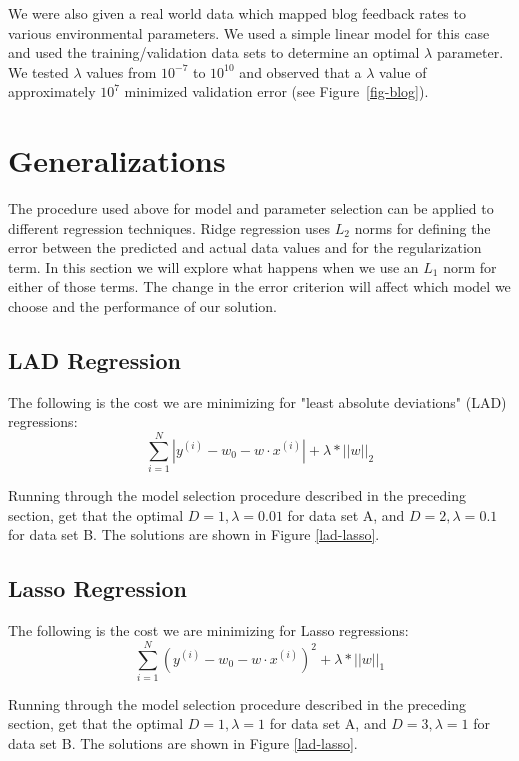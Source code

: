 \documentclass[11pt]{article}   %
\theoremstyle{plain}
\begin{document}
We were also given a real world data which mapped blog feedback rates to various environmental parameters. We used a simple linear model for this case and used the training/validation data sets to determine an optimal $\lambda$ parameter. We tested $\lambda$ values from $10^{-7}$ to $10^{10}$ and observed that a $\lambda$ value of approximately $10^7$ minimized validation error (see Figure~\ref{fig-blog}).

\section{Generalizations}

The procedure used above for model and parameter selection can be applied to different regression techniques. Ridge regression uses $L_2$ norms for defining the error between the predicted and actual data values and for the regularization term. In this section we will explore what happens when we use an $L_1$ norm for either of those terms. The change in the error criterion will affect which model we choose and the performance of our solution.

\subsection{LAD Regression}

The following is the cost we are minimizing for "least absolute deviations" (LAD) regressions: \[\sum\limits_{i=1}^{N} |y^{(i)} - w_0 - w \cdot x^{(i)}| + \lambda * ||w||_2\]

Running through the model selection procedure described in the preceding section, get that the optimal $D=1, \lambda=0.01$ for data set A, and $D=2, \lambda = 0.1$ for data set B. The solutions are shown in Figure \ref{lad-lasso}. 

\subsection{Lasso Regression}

The following is the cost we are minimizing for Lasso regressions: \[\sum\limits_{i=1}^{N} (y^{(i)} - w_0 - w \cdot x^{(i)})^2 + \lambda * ||w||_1\]

Running through the model selection procedure described in the preceding section, get that the optimal $D=1, \lambda=1$ for data set A, and $D=3, \lambda = 1$ for data set B. The solutions are shown in Figure \ref{lad-lasso}. 
\end{document}
